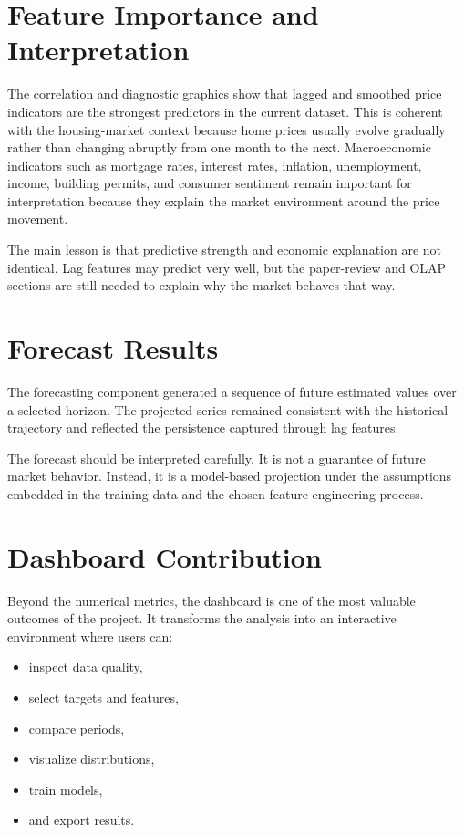 \section{Feature Importance and Interpretation}

The correlation and diagnostic graphics show that lagged and smoothed price indicators are the strongest predictors in the current dataset.
This is coherent with the housing-market context because home prices usually evolve gradually rather than changing abruptly from one month to the next.
Macroeconomic indicators such as mortgage rates, interest rates, inflation, unemployment, income, building permits, and consumer sentiment remain important for interpretation because they explain the market environment around the price movement.

The main lesson is that predictive strength and economic explanation are not identical.
Lag features may predict very well, but the paper-review and OLAP sections are still needed to explain why the market behaves that way.

\section{Forecast Results}

The forecasting component generated a sequence of future estimated values over a selected horizon.
The projected series remained consistent with the historical trajectory and reflected the persistence captured through lag features.

The forecast should be interpreted carefully.
It is not a guarantee of future market behavior.
Instead, it is a model-based projection under the assumptions embedded in the training data and the chosen feature engineering process.

\section{Dashboard Contribution}

Beyond the numerical metrics, the dashboard is one of the most valuable outcomes of the project.
It transforms the analysis into an interactive environment where users can:
\begin{itemize}
\item inspect data quality,
\item select targets and features,
\item compare periods,
\item visualize distributions,
\item train models,
\item and export results.
\end{itemize}

